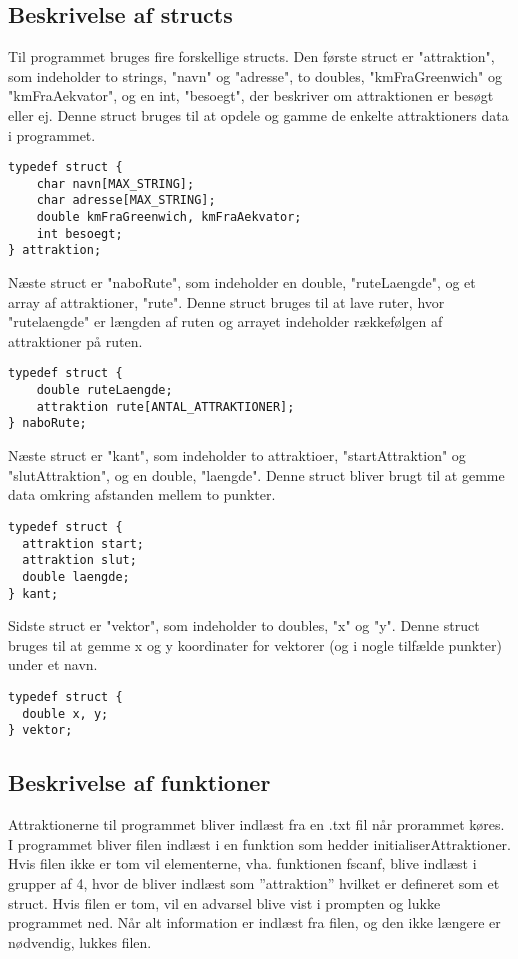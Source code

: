 \subsection{Beskrivelse af structs}
Til programmet bruges fire forskellige structs. Den første struct er "attraktion", som indeholder to strings, "navn" og "adresse", to doubles, "kmFraGreenwich" og "kmFraAekvator", og en int, "besoegt", der beskriver om attraktionen er besøgt eller ej. Denne struct bruges til at opdele og gamme de enkelte attraktioners data i programmet.\newline

\begin{lstlisting}
typedef struct {
	char navn[MAX_STRING];
	char adresse[MAX_STRING]; 
	double kmFraGreenwich, kmFraAekvator;
	int besoegt;
} attraktion;
\end{lstlisting} 

Næste struct er "naboRute", som indeholder en double, "ruteLaengde", og et array af attraktioner, "rute". Denne struct bruges til at lave ruter, hvor "rutelaengde" er længden af ruten og arrayet indeholder rækkefølgen af attraktioner på ruten. \newline

\begin{lstlisting}
typedef struct {
	double ruteLaengde;
	attraktion rute[ANTAL_ATTRAKTIONER];
} naboRute;
\end{lstlisting}

Næste struct er "kant", som indeholder to attraktioer, "startAttraktion" og "slutAttraktion", og en double, "laengde". Denne struct bliver brugt til at gemme data omkring afstanden mellem to punkter.\newline

\begin{lstlisting}
typedef struct {
  attraktion start;
  attraktion slut;
  double laengde;
} kant;
\end{lstlisting}

Sidste struct er "vektor", som indeholder to doubles, "x" og "y". Denne struct bruges til at gemme x og y koordinater for vektorer (og i nogle tilfælde punkter) under et navn. \newline

\begin{lstlisting}
typedef struct {
  double x, y;
} vektor;
\end{lstlisting}

\subsection{Beskrivelse af funktioner}
Attraktionerne til programmet bliver indlæst fra en .txt fil når prorammet køres. I programmet bliver filen indlæst i en funktion som hedder initialiserAttraktioner. Hvis filen ikke er tom vil elementerne, vha. funktionen fscanf, blive indlæst i grupper af 4, hvor de bliver indlæst som ”attraktion” hvilket er defineret som et struct. Hvis filen er tom, vil en advarsel blive vist i prompten og lukke programmet ned. Når alt information er indlæst fra filen, og den ikke længere er nødvendig, lukkes filen.\newline

